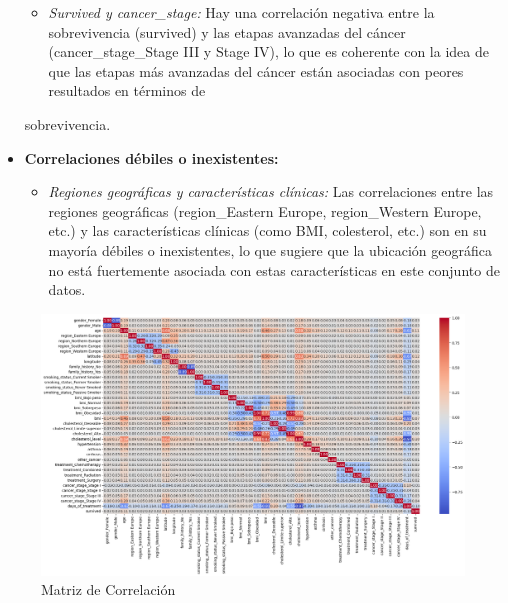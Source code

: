 \documentclass[10pt,journal,compsoc]{IEEEtran}
\begin{document}
\begin{itemize}
\begin{itemize}
    \item \emph{Survived y cancer\_stage:} Hay una correlación negativa entre la sobrevivencia (survived) y las etapas avanzadas del cáncer (cancer\_stage\_Stage III y Stage IV), lo que es coherente con la idea de que las etapas más avanzadas del cáncer están asociadas con peores resultados en términos de
  \end{itemize}
sobrevivencia.
  \item \textbf{Correlaciones débiles o inexistentes:}
  \begin{itemize}
    \item \emph{Regiones geográficas y características clínicas:} Las correlaciones entre las regiones geográficas (region\_Eastern Europe, region\_Western Europe, etc.) y las características clínicas (como BMI, colesterol, etc.) son en su mayoría débiles o inexistentes, lo que sugiere que la ubicación geográfica no está fuertemente asociada con estas características en este conjunto de datos.
  \end{itemize}


\end{itemize}


\begin{figure}[htb]
    \centering
    \includegraphics[width=\linewidth]{imagenes/MatrixCorrelacion.png}
    \caption{Matriz de Correlación}
    \label{fig:correlacion}
\end{figure}
\end{document}

